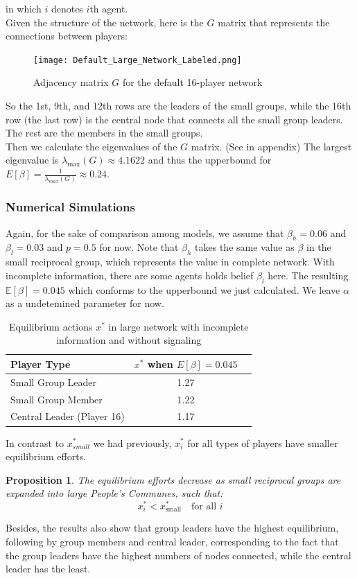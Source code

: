 \documentclass[12pt]{article}
\newtheorem{proposition}{Proposition}
\begin{document}
in which $i$ denotes $i$th agent.\\
\vspace{1em}
Given the structure of the network, here is the $G$ matrix that represents the connections between players:
\begin{figure}[H]
  \centering
  \texttt{[image: Default\_Large\_Network\_Labeled.png]}
  \caption{Adjacency matrix $G$ for the default 16-player network}
  \label{fig:G-matrix}
\end{figure}
So the 1st, 9th, and 12th rows are the leaders of the small groups, while the 16th row (the last row) is the central node that connects all the small group leaders. The rest are the members in the small groups.\\
Then we calculate the eigenvalues of the $G$ matrix. (See in appendix) The largest eigenvalue is $\lambda_{\text{max}}(G)  \approx 4.1622$ and thus the upperbound for $E[\beta] = \frac{1}{\lambda_{max}(G)} \approx 0.24$.\\
\subsubsection*{Numerical Simulations}
Again, for the sake of comparison among models, we assume that $\beta_h=0.06$ and $\beta_l=0.03$ and $p=0.5$ for now. Note that $\beta_h$ takes the same value as $\beta$ in the small reciprocal group, which represents the value in complete network. With incomplete information, there are some agents holds belief $\beta_l$ here. The resulting $\mathbb{E}[\beta]=0.045$ which conforms to the upperbound we just calculated. We leave $\alpha$ as a undetemined parameter for now.\\
\begin{table}[H]
  \centering
  \begin{tabular}{lcc}
  \toprule
  \textbf{Player Type}  & \textbf{\( x^* \) when \( E[\beta] = 0.045 \)} \\
  \midrule
  Small Group Leader        & 1.27 \\
  Small Group Member        & 1.22 \\
  Central Leader (Player 16)  & 1.17 \\
  \bottomrule
  \end{tabular}
  \caption{Equilibrium actions \( x^* \) in large network with incomplete information and without signaling}
  \label{tab:xstar-beta}
  \end{table}
In contrast to $x^*_{small}$ we had previously, $x^*_i$ for all types of players have smaller equilibrium efforts.\\
\begin{proposition}
  The equilibrium efforts decrease as small reciprocal groups are expanded into large People's Communes, such that:
  \[
  x^*_i < x^*_{\text{small}} \quad \text{for all } i
  \]
  \end{proposition}
Besides, the results also show that group leaders have the highest equilibrium, following by group members and central leader, corresponding to the fact that the group leaders have the highest numbers of nodes connected, while the central leader has the least.\\
\end{document}
